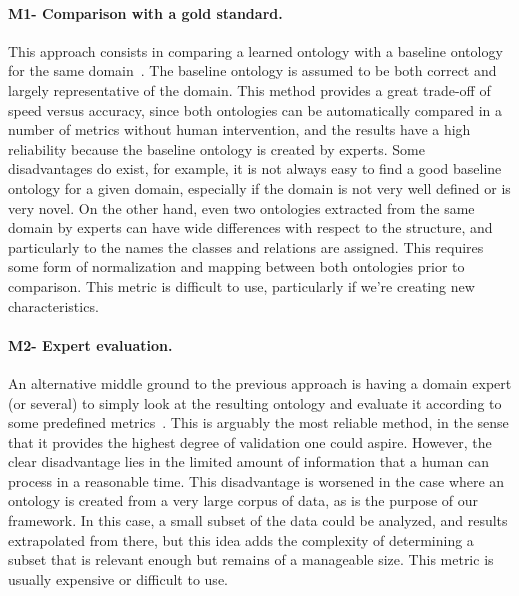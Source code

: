     \paragraph{M1- Comparison with a gold standard.}
	This approach consists in comparing a learned ontology with a baseline ontology
    for the same domain~\cite{corcoglioniti2016frame}. The baseline ontology is
    assumed to be both correct and largely representative of the domain. This method
    provides a great trade-off of speed versus accuracy, since both ontologies
    can be automatically compared in a number of metrics without human intervention,
    and the results have a high reliability because the baseline ontology is created
    by experts. Some disadvantages do exist, for example, it is not always easy to
    find a good baseline ontology for a given domain, especially if the domain is
    not very well defined or is very novel. On the other hand, even two ontologies
    extracted from the same domain by experts can have wide differences with respect to
    the structure, and particularly to the names the classes and relations are
    assigned. This requires some form of normalization and mapping between both ontologies
    prior to comparison. This metric is difficult to use, particularly if
    we're creating new characteristics.

    \paragraph{M2- Expert evaluation.}
    An alternative middle ground to the previous approach is having a domain
    expert (or several) to simply look at the resulting ontology and evaluate
    it according to some predefined metrics~\cite{ROSPOCHER2016132}.
    This is arguably the most reliable method, in the sense that it provides
    the highest degree of validation one could aspire. However, the clear
    disadvantage lies in the limited amount of information that a human can
    process in a reasonable time. This disadvantage is worsened in the case
    where an ontology is created from a very large corpus of data, as is
    the purpose of our framework. In this case, a small subset of the data
    could be analyzed, and results extrapolated from there, but this idea
    adds the complexity of determining a subset that is relevant enough but
    remains of a manageable size.
    This metric is usually expensive or difficult to use.

